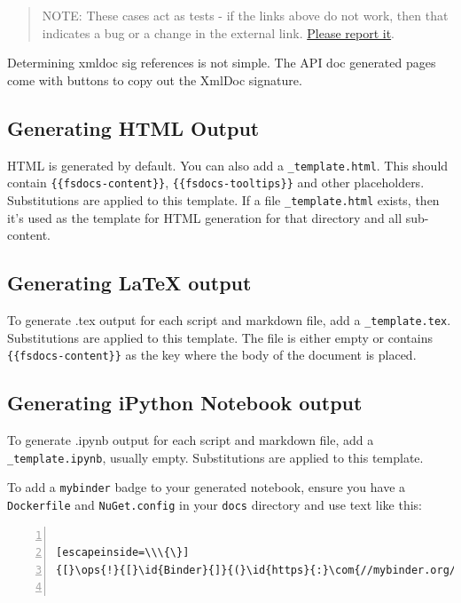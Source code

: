 \documentclass{article}
\newcommand{\id}[1]{\textcolor{black}{#1}}
\newcommand{\com}[1]{\textcolor{officegreen}{#1}}
\newcommand{\ops}[1]{\textcolor{purple}{#1}}
\begin{document}
\begin{quote}


NOTE: These cases act as tests - if the links above do not work, then that indicates a bug or a change in the
external link. \href{https://github.com/fsprojects/FSharp.Formatting/issues/new}{Please report it}.
\end{quote}



Determining xmldoc sig references is not simple.  The API doc generated pages come with
buttons to copy out the XmlDoc signature.
\subsection*{Generating HTML Output}



HTML is generated by default. You can also add a \texttt{\_template.html}.  This should contain \texttt{\{\{fsdocs-content\}\}},  \texttt{\{\{fsdocs-tooltips\}\}}
and other placeholders. Substitutions are
applied to this template.
If a file \texttt{\_template.html} exists, then it's used as the template for HTML generation for that directory and all sub-content.
\subsection*{Generating LaTeX output}



To generate .tex output for each script and markdown file, add a \texttt{\_template.tex}. Substitutions are
applied to this template. The file is either empty or contains \texttt{\{\{fsdocs-content\}\}} as the key where the body
of the document is placed.
\subsection*{Generating iPython Notebook output}



To generate .ipynb output for each script and markdown file, add a \texttt{\_template.ipynb}, usually empty. Substitutions are
applied to this template.


To add a \texttt{mybinder} badge to your generated notebook, ensure you have a \texttt{Dockerfile} and \texttt{NuGet.config}
in your \texttt{docs} directory and use text like this:
\begin{lstlisting}[numbers=left]

[escapeinside=\\\{\}]
{[}\ops{!}{[}\id{Binder}{]}{(}\id{https}{:}\com{//mybinder.org/badge\_logo.svg)](https://mybinder.org/v2/gh/fsprojects/FSharp.Formatting/gh-pages?filepath=literate.ipynb)}


\end{lstlisting}
\end{document}
